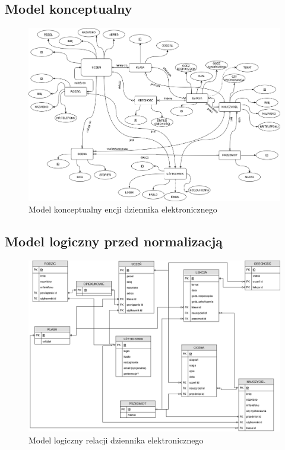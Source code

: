 \documentclass[12pt]{article}
\begin{document}
\begin{landscape}
\subsection{Model konceptualny}

\begin{figure}[h!]
    \centering
    \includegraphics[scale=0.47]{MKonceptualny.png}
    \caption{Model konceptualny encji dziennika elektronicznego}
    \label{fig:mk}
\end{figure}

\newpage
\subsection{Model logiczny przed normalizacją}

\begin{figure}[h!]
    \centering
    \includegraphics[scale=0.47]{MLogiczny.png}
    \caption{Model logiczny relacji dziennika elektronicznego}
    \label{fig:ml}
\end{figure}


\end{landscape}
\end{document}
